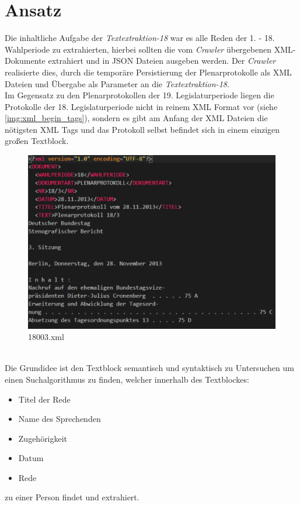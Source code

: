 \chapter{Ansatz}
Die inhaltliche Aufgabe der \textit{Textextraktion-18} war es alle Reden der 1. - 18. Wahlperiode zu extrahierten, hierbei sollten die vom \textit{Crawler} übergebenen XML-Dokumente extrahiert und in JSON Dateien ausgeben werden. Der \textit{Crawler} realisierte dies, durch die temporäre Persistierung der Plenarprotokolle als XML Dateien\cite{protokolle} und Übergabe als Parameter an die \textit{Textextraktion-18}.\\

\noindent Im Gegensatz zu den Plenarprotokollen der 19. Legislaturperiode liegen die Protokolle der 18. Legislaturperiode nicht in reinem XML Format vor (siehe \autoref{img:xml_begin_tags}), sondern es gibt am Anfang der XML Dateien die nötigsten XML Tags und das Protokoll selbst befindet sich in einem einzigen großen Textblock.
\begin{figure}[h]
	\includegraphics[width=\linewidth]{img/xml_begin_tags.pdf}
	\caption{18003.xml}
	\label{img:xml_begin_tags}
\end{figure}\\
Die Grundidee ist den Textblock semantisch und syntaktisch zu Untersuchen um einen Suchalgorithmus zu finden, welcher innerhalb des Textblockes:
\begin{multicols}{3}
	\begin{itemize}
		\item Titel der Rede
		\item Name des Sprechenden
		\item Zugehörigkeit
		\item Datum
		\item Rede
	\end{itemize}
\end{multicols}
zu einer Person findet und extrahiert.